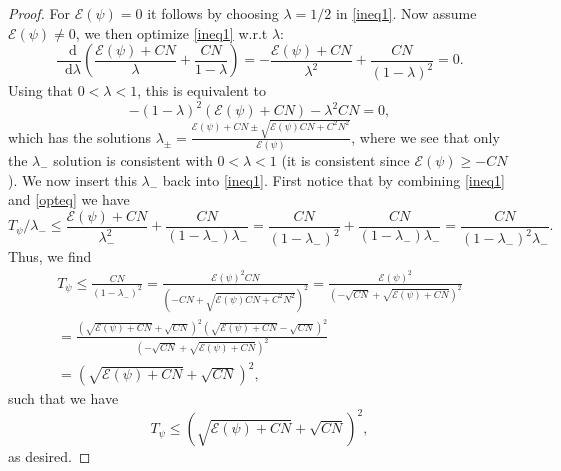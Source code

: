 \documentclass[a4paper,11pt]{article}
\newcommand*\diff{\mathop{}\!\mathrm{d}}
\numberwithin{equation}{section}
\begin{document}
 	\begin{proof}
 		For $ \mathcal{E}(\psi)=0 $ it follows by choosing $ \lambda=1/2 $ in \eqref{ineq1}. Now assume $ \mathcal{E}(\psi)\neq0 $,
 		we then optimize \eqref{ineq1} w.r.t $ \lambda $:\begin{equation}
 		\frac{\diff}{\diff\lambda}\left(\frac{\mathcal{E}(\psi)+CN}{\lambda}+\frac{CN}{1-\lambda}\right)=-\frac{\mathcal{E}(\psi)+CN}{\lambda^2}+\frac{CN}{(1-\lambda)^2}=0.\label{opteq}
 		\end{equation}
 		Using that $ 0<\lambda<1 $, this is equivalent to\begin{equation}
 		-(1-\lambda)^2(\mathcal{E}(\psi)+CN)-\lambda^2CN=0,
 		\end{equation}
 		which has the solutions $ \lambda_\pm=\frac{\mathcal{E}(\psi)+CN\pm\sqrt{\mathcal{E}(\psi)CN+C^2N^2}}{\mathcal{E}(\psi)} $, where we see that only the $ \lambda_- $ solution is consistent with $ 0<\lambda<1 $ (it is consistent since $ \mathcal{E}(\psi)\geq-CN $). We now insert this $ \lambda_- $ back into \eqref{ineq1}. First notice that by combining \eqref{ineq1} and \eqref{opteq} we have 
 		\begin{equation}
 		T_\psi/\lambda_-\leq\frac{\mathcal{E}(\psi)+CN}{\lambda_-^2}+\frac{CN}{(1-\lambda_-)\lambda_- }=\frac{CN}{(1-\lambda_-)^2}+\frac{CN}{(1-\lambda_-)\lambda_-}=\frac{CN}{(1-\lambda_-)^2\lambda_-}.
 		\end{equation}
 		Thus, we find
 		 \begin{equation}
 		\begin{aligned}
 		T_\psi\leq\frac{CN}{(1-\lambda_-)^2}=\frac{\mathcal{E}(\psi)^2CN}{(-CN+\sqrt{\mathcal{E}(\psi)CN+C^2N^2})^2}=\frac{\mathcal{E}(\psi)^2}{(-\sqrt{CN}+\sqrt{\mathcal{E}(\psi)+CN})^2}\\
 		=\frac{(\sqrt{\mathcal{E}(\psi)+CN}+\sqrt{CN})^2(\sqrt{\mathcal{E}(\psi)+CN}-\sqrt{CN})^2}{(-\sqrt{CN}+\sqrt{\mathcal{E}(\psi)+CN})^2}\\=(\sqrt{\mathcal{E}(\psi)+CN}+\sqrt{CN})^2,
 		\end{aligned}
 		\end{equation}
 		such that we have
 		 \begin{equation}
 		T_\psi\leq(\sqrt{\mathcal{E}(\psi)+CN}+\sqrt{CN})^2,
 		\end{equation}
 		as desired.
 	\end{proof}
\end{document}
